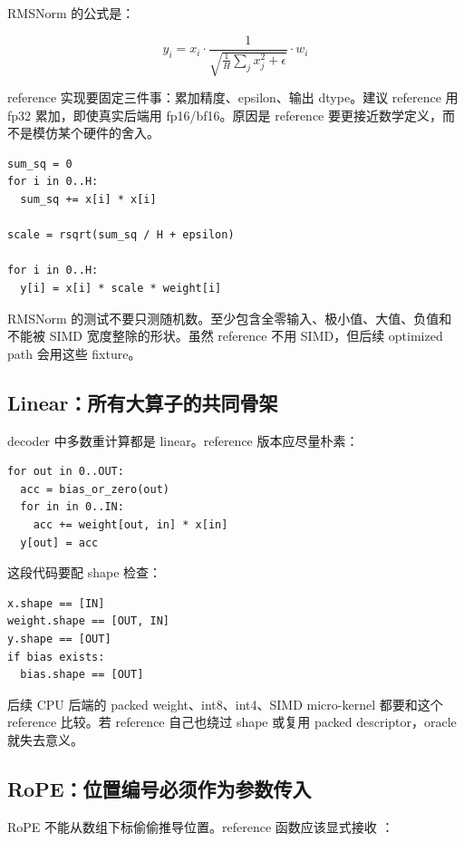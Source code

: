 RMSNorm 的公式是：

\[
y_i = x_i \cdot \frac{1}{\sqrt{\frac{1}{H}\sum_j x_j^2+\epsilon}} \cdot w_i
\]

reference 实现要固定三件事：累加精度、epsilon、输出 dtype。建议 reference 用 fp32 累加，即使真实后端用 fp16/bf16。原因是 reference 要更接近数学定义，而不是模仿某个硬件的舍入。

\begin{lstlisting}[numbers=none,caption={RMSNorm reference 伪代码}]
sum_sq = 0
for i in 0..H:
  sum_sq += x[i] * x[i]

scale = rsqrt(sum_sq / H + epsilon)

for i in 0..H:
  y[i] = x[i] * scale * weight[i]
\end{lstlisting}

RMSNorm 的测试不要只测随机数。至少包含全零输入、极小值、大值、负值和  不能被 SIMD 宽度整除的形状。虽然 reference 不用 SIMD，但后续 optimized path 会用这些 fixture。

\subsection{Linear：所有大算子的共同骨架}

decoder 中多数重计算都是 linear。reference 版本应尽量朴素：

\begin{lstlisting}[numbers=none,caption={Linear reference 语义}]
for out in 0..OUT:
  acc = bias_or_zero(out)
  for in in 0..IN:
    acc += weight[out, in] * x[in]
  y[out] = acc
\end{lstlisting}

这段代码要配 shape 检查：

\begin{lstlisting}[numbers=none,caption={Linear shape 合同}]
x.shape == [IN]
weight.shape == [OUT, IN]
y.shape == [OUT]
if bias exists:
  bias.shape == [OUT]
\end{lstlisting}

后续 CPU 后端的 packed weight、int8、int4、SIMD micro-kernel 都要和这个 reference 比较。若 reference 自己也绕过 shape 或复用 packed descriptor，oracle 就失去意义。

\subsection{RoPE：位置编号必须作为参数传入}

RoPE 不能从数组下标偷偷推导位置。reference 函数应该显式接收 ：

